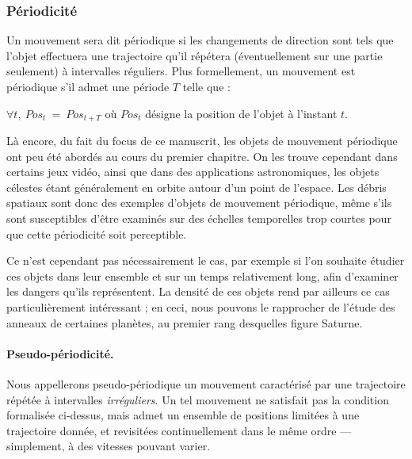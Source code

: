 	\FloatBarrier \subsubsection{Périodicité}
	Un mouvement sera dit périodique si les changements de direction sont tels que l'objet effectuera une trajectoire qu'il répétera (éventuellement sur une partie seulement) à intervalles réguliers. Plus formellement, un mouvement est périodique s'il admet une période $T$ telle que :
	
	$\forall t,~Pos_{t}~=~Pos_{t+T}$ où $Pos_{t}$ désigne la position de l'objet à l'instant $t$.
	
	Là encore, du fait du focus de ce manuscrit, les objets de mouvement périodique ont peu été abordés au cours du premier chapitre. On les trouve cependant dans certains jeux vidéo, ainsi que dans des applications astronomiques, les objets célestes étant généralement en orbite autour d'un point de l'espace. Les débris spatiaux sont donc des exemples d'objets de mouvement périodique, même s'ils sont susceptibles d'être examinés sur des échelles temporelles trop courtes pour que cette périodicité soit perceptible.
	
	Ce n'est cependant pas nécessairement le cas, par exemple si l'on souhaite étudier ces objets dans leur ensemble et sur un temps relativement long, afin d'examiner les dangers qu'ils représentent. La densité de ces objets rend par ailleurs ce cas particulièrement intéressant ; en ceci, nous pouvons le rapprocher de l'étude des anneaux de certaines planètes, au premier rang desquelles figure Saturne\footnotemark{}.
	
	
	\paragraph{Pseudo-périodicité.}
	Nous appellerons pseudo-périodique un mouvement caractérisé par une trajectoire répétée à intervalles \emph{irréguliers}. Un tel mouvement ne satisfait pas la condition formalisée ci-dessus, mais admet un ensemble de positions limitées à une trajectoire donnée, et revisitées continuellement dans le même ordre --- simplement, à des vitesses pouvant varier.
	
